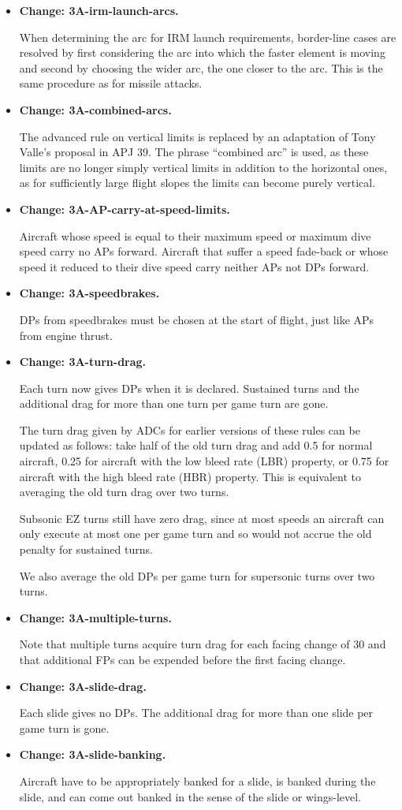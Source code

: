 \documentclass[10pt]{report}
\newcommand{\itemtag}[1]{\item \textbf{Change: #1.}\par}
\begin{document}
\begin{itemize}
    \itemtag{3A-irm-launch-arcs} When determining the arc for IRM launch requirements, border-line cases are resolved by first considering the arc into which the faster element is moving and second by choosing the wider arc, the one closer to the  arc. This is the same procedure as for missile attacks.    

    \itemtag{3A-combined-arcs} The advanced rule on vertical limits is replaced by an adaptation of Tony Valle's proposal in APJ 39. The phrase “combined arc” is used, as these limits are no longer simply vertical limits in addition to the horizontal ones, as for sufficiently large flight slopes the limits can become purely vertical.

    \itemtag{3A-AP-carry-at-speed-limits} Aircraft whose speed is equal to their maximum speed or maximum dive speed carry no APs forward. Aircraft that suffer a speed fade-back or whose speed it reduced to their dive speed carry neither APs not DPs forward.

    \itemtag{3A-speedbrakes} DPs from speedbrakes must be chosen at the start of flight, just like APs from engine thrust.
    
    \itemtag{3A-turn-drag} Each turn now gives DPs when it is declared. Sustained turns and the additional drag for more than one turn per game turn are gone.
    
    The turn drag given by ADCs for earlier versions of these rules can be updated as follows: take half of the old turn drag and add 0.5 for normal aircraft, 0.25 for aircraft with the low bleed rate (LBR) property, or 0.75 for aircraft with the high bleed rate (HBR) property. This is equivalent to averaging the old turn drag over two turns.
    
    Subsonic EZ turns still have zero drag, since at most speeds an aircraft can only execute at most one per game turn and so would not accrue the old penalty for sustained turns.

    We also average the old DPs per game turn for supersonic turns over two turns.

    \itemtag{3A-multiple-turns} Note that multiple turns acquire turn drag for each facing change of 30{\deg} and that additional FPs can be expended before the first facing change.
    
    \itemtag{3A-slide-drag} Each slide gives no DPs.  The additional drag for more than one slide per game turn is gone.
    
    \itemtag{3A-slide-banking} Aircraft have to be appropriately banked for a slide, is banked during the slide, and can come out banked in the sense of the slide or wings-level.


\end{itemize}
\end{document}
